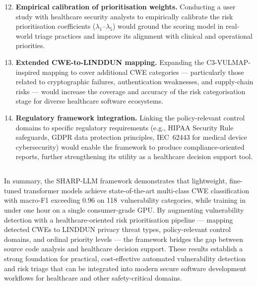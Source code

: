 \begin{enumerate}
    \setcounter{enumi}{11}
    \item \textbf{Empirical calibration of prioritisation weights.}
          Conducting a user study with healthcare security analysts to
          empirically calibrate the risk prioritisation coefficients
          ($\lambda_1$--$\lambda_5$) would ground the scoring model in
          real-world triage practices and improve its alignment with
          clinical and operational priorities.

    \item \textbf{Extended CWE-to-LINDDUN mapping.}
          Expanding the C3-VULMAP-inspired mapping to cover additional CWE
          categories --- particularly those related to cryptographic
          failures, authentication weaknesses, and supply-chain risks ---
          would increase the coverage and accuracy of the risk
          categorisation stage for diverse healthcare software ecosystems.

    \item \textbf{Regulatory framework integration.}
          Linking the policy-relevant control domains to specific
          regulatory requirements (e.g., HIPAA Security Rule safeguards,
          GDPR data protection principles, IEC~62443 for medical device
          cybersecurity) would enable the framework to produce
          compliance-oriented reports, further strengthening its utility
          as a healthcare decision support tool.
\end{enumerate}

\subsection*{}
In summary, the SHARP-LLM framework demonstrates that lightweight,
fine-tuned transformer models achieve state-of-the-art multi-class CWE
classification with macro-F1 exceeding 0.96 on 118~vulnerability
categories, while training in under one hour on a single consumer-grade
GPU.  By augmenting vulnerability detection with a healthcare-oriented
risk prioritisation pipeline --- mapping detected CWEs to LINDDUN privacy
threat types, policy-relevant control domains, and ordinal priority
levels --- the framework bridges the gap between source code analysis and
healthcare decision support.  These results establish a strong foundation
for practical, cost-effective automated vulnerability detection and risk
triage that can be integrated into modern secure software development
workflows for healthcare and other safety-critical domains.
